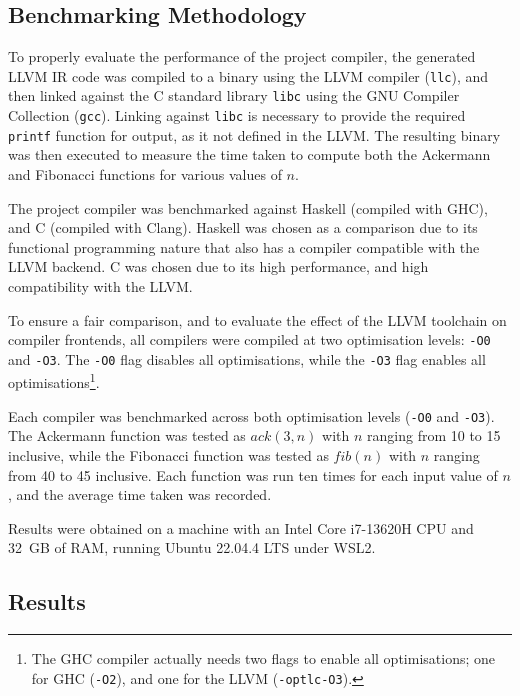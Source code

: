 \subsection{Benchmarking Methodology}

To properly evaluate the performance of the project compiler, the generated LLVM IR code was
compiled to a binary using the LLVM compiler (\texttt{llc}), and then linked against the C standard
library \texttt{libc} using the GNU Compiler Collection (\texttt{gcc}). Linking against
\texttt{libc} is necessary to provide the required \texttt{printf} function for output, as it not
defined in the LLVM. The resulting binary was then executed to measure the time taken to compute
both the Ackermann and Fibonacci functions for various values of $n$.

The project compiler was benchmarked against Haskell (compiled with GHC), and C (compiled with
Clang). Haskell was chosen as a comparison due to its functional programming nature that also has a
compiler compatible with the LLVM backend. C was chosen due to its high performance, and high
compatibility with the LLVM.

To ensure a fair comparison, and to evaluate the effect of the LLVM toolchain on compiler frontends,
all compilers were compiled at two optimisation levels: \texttt{-O0} and \texttt{-O3}. The
\texttt{-O0} flag disables all optimisations, while the \texttt{-O3} flag enables all
optimisations\footnote{The GHC compiler actually needs two flags to enable all optimisations; one
for GHC (\texttt{-O2}), and one for the LLVM (\texttt{-optlc-O3}).}.

Each compiler was benchmarked across both optimisation levels (\texttt{-O0} and \texttt{-O3}). The
Ackermann function was tested as $ack(3,n)$ with $n$ ranging from 10 to 15 inclusive, while the
Fibonacci function was tested as $fib(n)$ with $n$ ranging from 40 to 45 inclusive. Each function
was run ten times for each input value of $n$, and the average time taken was recorded.

Results were obtained on a machine with an Intel Core i7-13620H CPU and 32 GB of RAM, running Ubuntu
22.04.4 LTS under WSL2.

\subsection{Results}

